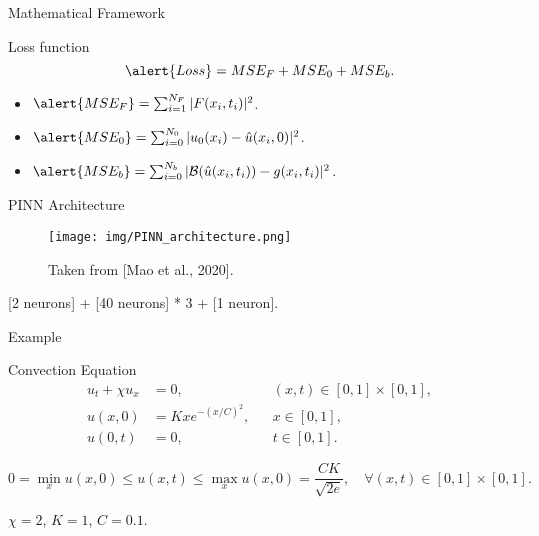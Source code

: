     \begin{frame}{Mathematical Framework}
        \begin{block}{Loss function}
            $$\alert{Loss} = MSE_F+MSE_0+MSE_b.$$
            \begin{itemize}
                \item $\alert{MSE_F}=\sum_{i=1}^{N_F}\vert F(x_i, t_i)\vert^2$.
                \item $\alert{MSE_0}=\sum_{i=0}^{N_0}\vert u_0(x_i)-\hat u(x_i, 0)\vert^2$.
                \item $\alert{MSE_b}=\sum_{i=0}^{N_b}\vert \mathcal{B}(\hat u(x_i,t_i))-g(x_i,t_i)\vert^2$.
            \end{itemize}
        \end{block}
    \end{frame}
    
    \begin{frame}{PINN Architecture}
        \vspace*{-0.2cm}
        \begin{figure}
            \centering
            \texttt{[image: img/PINN\_architecture.png]}
            \caption{Taken from [Mao et al., 2020].}
        \end{figure}
        
        \vspace*{-0.2cm}
        {
        \small
         [2 neurons] + [40 neurons] * 3 + [1 neuron].
        }
    \end{frame}
    
    \begin{frame}{Example}
        \begin{block}{Convection Equation}
            \vspace*{-0.4cm}
            \begin{align*}
            u_t+\chi u_x&=0, &&(x, t)\in[0,1]\times[0, 1],\\
            u(x,0)&=Kxe^{-(x/C)^2}, &&x\in[0,1],\\
            u(0,t)&=0, &&t\in[0,1].
            \end{align*}
        \end{block}
        
        \vspace*{0.4cm}
        $$ 0=\min_xu(x,0)\le u(x,t)\le \max_x u(x,0)=\frac{CK}{\sqrt{2e}}, \quad\forall(x,t)\in[0,1]\times[0,1].$$
        
        \vspace*{0.4cm}
         $\chi=2$, $K=1$, $C=0.1$.
    \end{frame}
    

